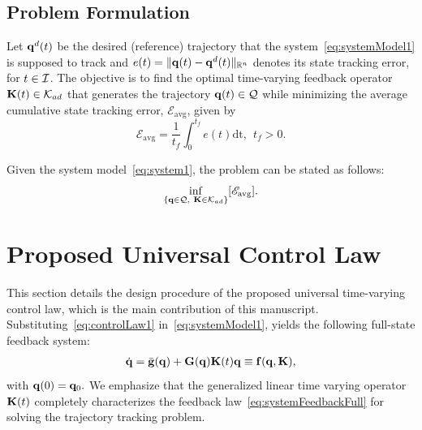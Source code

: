 \documentclass[
12pt,draftcls,onecolumn%
]{IEEEtran}
\begin{document}
\subsection{Problem Formulation} 
Let ${\bf q}^d(t)$ be the desired (reference) trajectory that the system~\eqref{eq:systemModel1} is supposed to track and $e(t) = \|{\bf q}(t)-{\bf q}^d(t)\|_{\mathbb{R}^n}$ denotes its state tracking error, for $t\in {\cal I}$. The objective is to find the optimal time-varying feedback operator  ${\bf K}(t)\in {\cal K}_{ad}$ that generates the trajectory ${\bf q}(t)\in{\cal Q}$ while minimizing the average cumulative state tracking error, $\mathscr{E}_{\mathrm{avg}}$, given by 
\begin{equation}
\mathscr{E}_{\mathrm{avg}} = \frac{1}{t_f}\int_{0}^{t_f}e(t)\mathrm{dt},~~t_f>0.
\label{eq:tracking-error}
\end{equation}

Given the system model~\eqref{eq:system1}, the problem can be stated as follows:
\begin{equation}
\inf_{\{{\bf q}\in{\cal Q},~{\bf K}\in{\cal K}_{ad}\}} [\mathscr{E}_{\mathrm{avg}}].
\label{eq:problem}
\end{equation}

\section{Proposed Universal Control Law}
\label{sec:feedbackOperator}
This section details the design procedure of the proposed universal time-varying control law, which is the main contribution of this manuscript. Substituting~\eqref{eq:controlLaw1} in~\eqref{eq:systemModel1}, yields the following full-state feedback system:
\begin{equation}
\begin{split}
\dot{{\bf q}}  = \bar{{\bf g}}({\bf q}) + {\bf G}({\bf q}){\bf K}(t) {\bf q} \equiv{\bf f}({\bf q},{\bf K}),
\end{split}
\label{eq:systemFeedbackFull}
\end{equation}
with ${\bf q}(0)={\bf q}_0.$ We emphasize that the generalized linear time varying operator ${\bf K}(t)$ completely characterizes the feedback law~\eqref{eq:systemFeedbackFull} for solving the trajectory tracking problem. 
\end{document}
